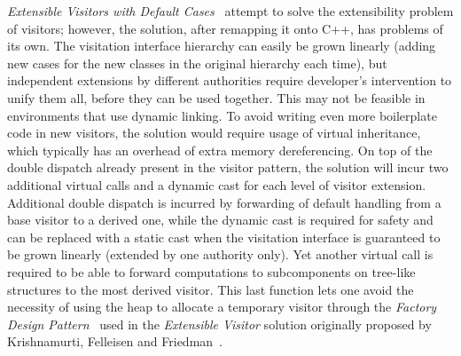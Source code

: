 \documentclass[preprint]{sigplanconf}
\begin{document}

\emph{Extensible Visitors with Default Cases}~\cite[]{Zenger:2001} attempt to solve the extensibility problem of visitors; 
however, the solution, after 
remapping it onto C++, has problems of its own. The visitation interface 
hierarchy can easily be grown linearly (adding new cases for the new classes in 
the original hierarchy each time), but independent extensions by different  
authorities require developer's intervention to unify them all, before they can 
be used together. This may not be feasible in environments that use dynamic 
linking. To avoid writing even more boilerplate code in new visitors, the 
solution would require usage of virtual inheritance, which typically has 
an overhead of extra memory dereferencing. On top of the double dispatch already 
present in the visitor pattern, the solution will incur two additional virtual 
calls and a dynamic cast for each level of visitor extension. Additional double 
dispatch is incurred by forwarding of default handling from a base visitor to a 
derived one, while the dynamic cast is required for safety and can be replaced 
with a static cast when the visitation interface is guaranteed to be grown linearly 
(extended by one authority only). Yet another virtual call is required to be 
able to forward computations to subcomponents on tree-like structures to the 
most derived visitor. This last function lets one avoid the necessity of using 
the heap to allocate a temporary visitor through the \emph{Factory Design 
Pattern}~\cite{DesignPatterns1993} used in the \emph{Extensible Visitor} solution 
originally proposed by Krishnamurti, Felleisen and Friedman~\cite{Krishnamurthi98}.
\end{document}
